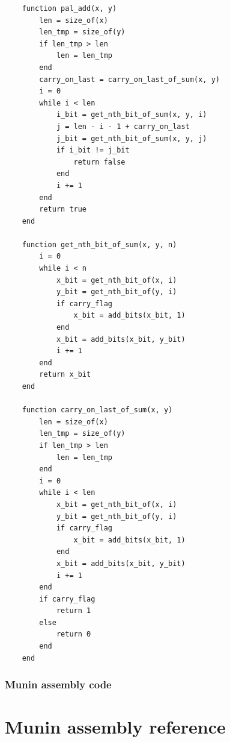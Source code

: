 \documentclass[11pt, a4paper]{article}
\begin{document}
\begin{lstlisting}
    function pal_add(x, y)
        len = size_of(x)
        len_tmp = size_of(y)
        if len_tmp > len
            len = len_tmp
        end
        carry_on_last = carry_on_last_of_sum(x, y)
        i = 0
        while i < len
            i_bit = get_nth_bit_of_sum(x, y, i)
            j = len - i - 1 + carry_on_last
            j_bit = get_nth_bit_of_sum(x, y, j)
            if i_bit != j_bit
                return false
            end
            i += 1
        end
        return true
    end

    function get_nth_bit_of_sum(x, y, n)
        i = 0
        while i < n
            x_bit = get_nth_bit_of(x, i)
            y_bit = get_nth_bit_of(y, i)
            if carry_flag
                x_bit = add_bits(x_bit, 1)
            end
            x_bit = add_bits(x_bit, y_bit)
            i += 1
        end
        return x_bit
    end

    function carry_on_last_of_sum(x, y)
        len = size_of(x)
        len_tmp = size_of(y)
        if len_tmp > len
            len = len_tmp
        end
        i = 0
        while i < len
            x_bit = get_nth_bit_of(x, i)
            y_bit = get_nth_bit_of(y, i)
            if carry_flag
                x_bit = add_bits(x_bit, 1)
            end
            x_bit = add_bits(x_bit, y_bit)
            i += 1
        end
        if carry_flag
            return 1
        else
            return 0
        end
    end
\end{lstlisting}

\subsubsection{Munin assembly code}



\newpage
\section{Munin assembly reference}
\end{document}
